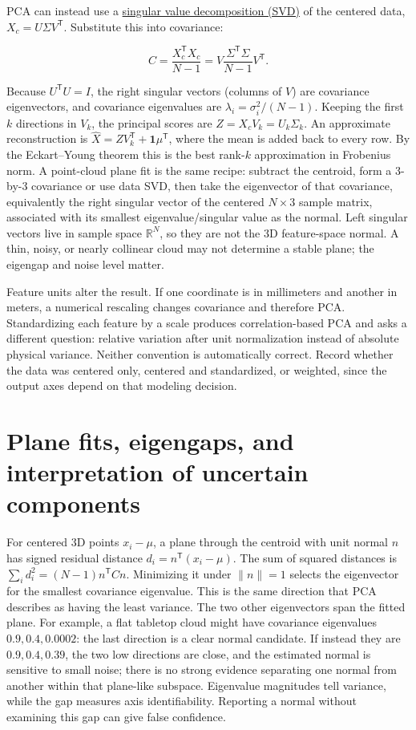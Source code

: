PCA can instead use a \hyperref[02-foundations-ii-ch024-full-thin-and-compact-shapes-for-tall-and-wide-matrices]{singular value decomposition (SVD)} of the centered data, \(X_c=U\Sigma V^\mathsf T\). Substitute this into covariance:

\[
C=\frac{X_c^\mathsf TX_c}{N-1}
=V\frac{\Sigma^\mathsf T\Sigma}{N-1}V^\mathsf T.
\]

Because \(U^\mathsf TU=I\), the right singular vectors (columns of \(V\)) are covariance eigenvectors, and covariance eigenvalues are \(\lambda_i=\sigma_i^2/(N-1)\). Keeping the first \(k\) directions in \(V_k\), the principal scores are \(Z=X_cV_k=U_k\Sigma_k\). An approximate reconstruction is \(\hat X=ZV_k^\mathsf T+\mathbf1\mu^\mathsf T\), where the mean is added back to every row. By the Eckart--Young theorem this is the best rank-\(k\) approximation in Frobenius norm. A point-cloud plane fit is the same recipe: subtract the centroid, form a 3-by-3 covariance or use data SVD, then take the eigenvector of that covariance, equivalently the right singular vector of the centered \(N\times3\) sample matrix, associated with its smallest eigenvalue/singular value as the normal. Left singular vectors live in sample space \(\mathbb R^N\), so they are not the 3D feature-space normal. A thin, noisy, or nearly collinear cloud may not determine a stable plane; the eigengap and noise level matter.

Feature units alter the result. If one coordinate is in millimeters and another in meters, a numerical rescaling changes covariance and therefore PCA. Standardizing each feature by a scale produces correlation-based PCA and asks a different question: relative variation after unit normalization instead of absolute physical variance. Neither convention is automatically correct. Record whether the data was centered only, centered and standardized, or weighted, since the output axes depend on that modeling decision.

\section{Plane fits, eigengaps, and interpretation of uncertain components}\label{02-foundations-ii-ch024-plane-fits-eigengaps-and-interpretation-of-uncertain-components}

For centered 3D points \(x_i-\mu\), a plane through the centroid with unit normal \(n\) has signed residual distance \(d_i=n^\mathsf T(x_i-\mu)\). The sum of squared distances is \(\sum_i d_i^2=(N-1)n^\mathsf TCn\). Minimizing it under \(\|n\|=1\) selects the eigenvector for the smallest covariance eigenvalue. This is the same direction that PCA describes as having the least variance. The two other eigenvectors span the fitted plane. For example, a flat tabletop cloud might have covariance eigenvalues \(0.9,0.4,0.0002\): the last direction is a clear normal candidate. If instead they are \(0.9,0.4,0.39\), the two low directions are close, and the estimated normal is sensitive to small noise; there is no strong evidence separating one normal from another within that plane-like subspace. Eigenvalue magnitudes tell variance, while the gap measures axis identifiability. Reporting a normal without examining this gap can give false confidence.

